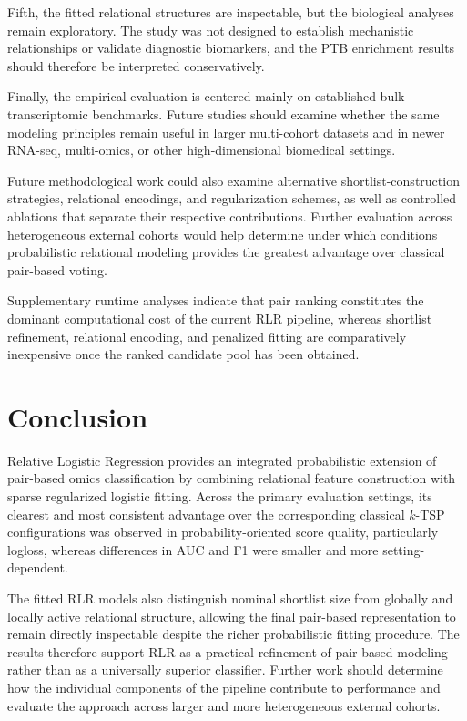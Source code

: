 \documentclass[journal]{IEEEtran}
\begin{document}
Fifth, the fitted relational structures are inspectable, but the biological analyses remain exploratory. The study was not designed to establish mechanistic relationships or validate diagnostic biomarkers, and the PTB enrichment results should therefore be interpreted conservatively.

Finally, the empirical evaluation is centered mainly on established bulk transcriptomic benchmarks. Future studies should examine whether the same modeling principles remain useful in larger multi-cohort datasets and in newer RNA-seq, multi-omics, or other high-dimensional biomedical settings.

Future methodological work could also examine alternative shortlist-construction strategies, relational encodings, and regularization schemes, as well as controlled ablations that separate their respective contributions. Further evaluation across heterogeneous external cohorts would help determine under which conditions probabilistic relational modeling provides the greatest advantage over classical pair-based voting.

Supplementary runtime analyses indicate that pair ranking constitutes the dominant computational cost of the current RLR pipeline, whereas shortlist refinement, relational encoding, and penalized fitting are comparatively inexpensive once the ranked candidate pool has been obtained.

\section{Conclusion}\label{sec:conclusion}

Relative Logistic Regression provides an integrated probabilistic extension of pair-based omics classification by combining relational feature construction with sparse regularized logistic fitting. Across the primary evaluation settings, its clearest and most consistent advantage over the corresponding classical $k$-TSP configurations was observed in probability-oriented score quality, particularly logloss, whereas differences in AUC and F1 were smaller and more setting-dependent.

The fitted RLR models also distinguish nominal shortlist size from globally and locally active relational structure, allowing the final pair-based representation to remain directly inspectable despite the richer probabilistic fitting procedure. The results therefore support RLR as a practical refinement of pair-based modeling rather than as a universally superior classifier. Further work should determine how the individual components of the pipeline contribute to performance and evaluate the approach across larger and more heterogeneous external cohorts.
\end{document}

